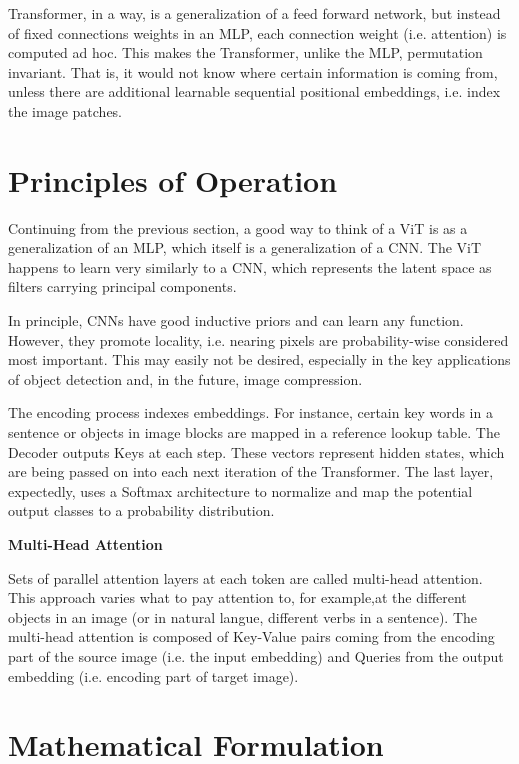 Transformer, in a way, is a generalization of a feed forward network, but 
instead of fixed connections weights in an MLP, each connection weight (i.e. attention) 
is computed ad hoc. This makes the Transformer, unlike the MLP, permutation invariant. 
That is, it would not know where certain information is coming from, unless there are additional 
learnable sequential positional embeddings, i.e. index the image patches.


\section{Principles of Operation}

Continuing from the previous section, a good way to think of a ViT is as a 
generalization of an MLP, which itself is a generalization of a CNN. 
The ViT happens to learn very similarly to a CNN, which represents the latent space
as filters carrying principal components.

In principle, CNNs have good inductive priors and can learn any function. 
However, they promote locality, i.e. nearing pixels are probability-wise considered most important.
This may easily not be desired, especially in the key applications of object detection and, in the 
future, image compression.


The encoding process indexes embeddings. For instance, certain key words in a sentence or 
objects in image blocks are mapped in a reference lookup table. 
The Decoder outputs Keys at each step. These vectors represent hidden states,
which are being passed on into each next iteration of the Transformer. 
The last layer, expectedly, uses a Softmax architecture to normalize and map the potential output classes 
to a probability distribution. 

\vspace{10mm}

\textbf{Multi-Head Attention}


Sets of parallel attention layers at each token are called multi-head attention.
This approach varies what to pay attention to, for example,at the different objects 
in an image (or in natural langue, different verbs in a sentence). 
The multi-head attention is composed of Key-Value pairs coming from 
the encoding part of the source image (i.e. the input embedding) and 
Queries from the output embedding (i.e. encoding part of target image).


\section{Mathematical Formulation}


